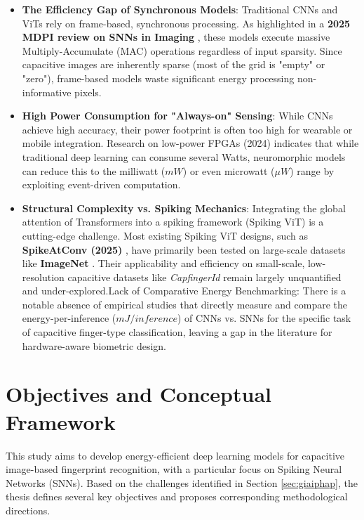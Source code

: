 \documentclass[../main.tex]{subfiles}
\begin{document}
\begin{itemize}
\item \textbf{The Efficiency Gap of Synchronous Models}: Traditional CNNs and ViTs rely on frame-based, synchronous processing. As highlighted in a \textbf{2025 MDPI review on SNNs in Imaging} \cite{MDPI_review_on_SNNs_in_Imaging}, these models execute massive Multiply-Accumulate (MAC) operations regardless of input sparsity. Since capacitive images are inherently sparse (most of the grid is "empty" or "zero"), frame-based models waste significant energy processing non-informative pixels.

\item \textbf{High Power Consumption for "Always-on" Sensing}: While CNNs achieve high accuracy, their power footprint is often too high for wearable or mobile integration. Research on low-power FPGAs (2024)\cite{HE2024109806}\cite{Real-time-multicompartment-Hodgkin-Huxley-neuron-emulation-on-SoC-FPGA} indicates that while traditional deep learning can consume several Watts, neuromorphic models can reduce this to the milliwatt ($mW$) or even microwatt ($\mu W$) range by exploiting event-driven computation.
\item \textbf{Structural Complexity vs. Spiking Mechanics}: Integrating the global attention of Transformers into a spiking framework (Spiking ViT) is a cutting-edge challenge. Most existing Spiking ViT designs, such as \textbf{SpikeAtConv (2025)} \cite{SpikeAtConv}, have primarily been tested on large-scale datasets like \textbf{ImageNet} \cite{ImageNet}. Their applicability and efficiency on small-scale, low-resolution capacitive datasets like \textit{CapfingerId} remain largely unquantified and under-explored.Lack of Comparative Energy Benchmarking: There is a notable absence of empirical studies that directly measure and compare the energy-per-inference ($mJ/inference$) of CNNs vs. SNNs for the specific task of capacitive finger-type classification, leaving a gap in the literature for hardware-aware biometric design.
\end{itemize}

\section{ Objectives and Conceptual Framework}
This study aims to develop energy-efficient deep learning models for capacitive image-based fingerprint recognition, with a particular focus on Spiking Neural Networks (SNNs). Based on the challenges identified in Section \ref{sec:giaiphap}, the thesis defines several key objectives and proposes corresponding methodological directions.
\end{document}
